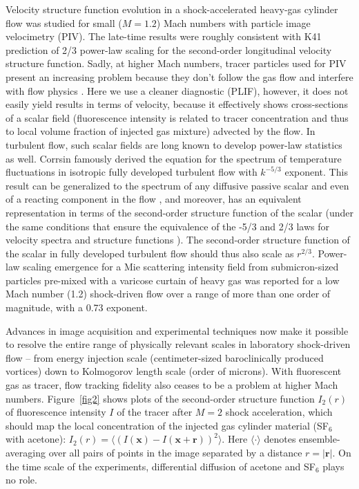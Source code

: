 \documentclass[preprint,superscriptaddress,showpacs]{revtex4-1}
\begin{document}
Velocity structure function evolution in a shock-accelerated heavy-gas cylinder flow 
was studied for small ($M=1.2$) Mach numbers \cite{mohamed} with 
particle image velocimetry (PIV). The late-time results were roughly consistent with K41
prediction of 2/3 power-law scaling for the second-order longitudinal velocity 
structure function. 
Sadly, at
higher Mach numbers, tracer particles used for PIV present an increasing problem because 
they
don't follow the gas flow \cite{anderson2015experimental} and interfere with flow 
physics \cite{prl}. Here we use a cleaner 
diagnostic (PLIF), however, it does not easily yield results in terms of velocity, because it effectively 
shows cross-sections of a scalar field (fluorescence intensity is related to tracer concentration and
thus to local volume fraction of injected gas mixture) 
advected by the flow. In turbulent flow, such scalar fields are long known to develop 
power-law statistics as well. Corrsin \cite{corrsin} famously derived the equation for the
spectrum of temperature fluctuations in isotropic fully developed turbulent flow with $k^{-5/3}$ exponent. This result can be generalized to the spectrum of any diffusive passive scalar and even of a reacting component in the flow \cite{monin2013statistical}, and moreover, has an equivalent 
representation in terms of the second-order structure function of the scalar (under the same
conditions that ensure the equivalence of the -5/3 and 2/3 laws for velocity spectra and structure
functions \cite{monin2013statistical}). The second-order structure function of the scalar 
in fully developed turbulent flow should thus also scale as $r^{2/3}$. Power-law scaling emergence 
for a Mie scattering intensity field from submicron-sized particles pre-mixed with a varicose 
curtain of heavy gas 
was reported \cite{vorobieff98} for a low Mach number (1.2) shock-driven flow over a range of more than 
one order of magnitude, with a 0.73 exponent. 

Advances in image acquisition and experimental techniques now make it possible to resolve the entire
range of physically relevant scales in laboratory shock-driven flow -- from energy injection scale 
(centimeter-sized baroclinically produced vortices) down to Kolmogorov 
length scale (order of microns). With 
fluorescent gas as tracer, flow tracking fidelity also ceases to be a problem at higher Mach numbers.
Figure~\ref{fig2} shows plots of the second-order structure function $I_2(r)$ of fluorescence intensity 
$I$ of the 
tracer  after $M=2$ shock acceleration, which should map the local concentration of the injected gas cylinder 
material (SF$_6$ with acetone):
$
I_2(r)=\langle \left(I(\mathbf{x})- I(\mathbf{x} + \mathbf{r}) \right)^2 \rangle
$.
Here $\langle \cdot \rangle$ denotes ensemble-averaging over all pairs of points in the image separated 
by a distance $r = \left|\mathbf{r}\right| $.
 On the time scale of the experiments, differential diffusion of acetone
and SF$_6$ plays no role.  
\end{document}
